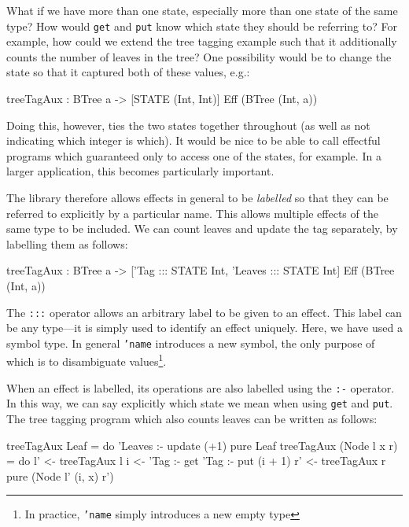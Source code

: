 What if we have more than one state, especially more than one state of the
same type? How would \texttt{get} and \texttt{put}
know which state they should be referring to? For example, how could we
extend the tree tagging example such that it additionally counts the number
of leaves in the tree?
%
One possibility would be to change the state so that it captured both of
these values, e.g.:

\begin{code}
treeTagAux : BTree a -> { [STATE (Int, Int)] } Eff (BTree (Int, a))
\end{code}

\noindent
Doing this, however, ties the two states together throughout (as well as
not indicating which integer is which). It would be nice to be able to
call effectful programs which guaranteed only to access one of the states,
for example. In a larger application, this becomes particularly important.

The \effects{} library therefore allows effects in general to be
\emph{labelled} so that they can be referred to explicitly by a particular
name. This allows multiple effects of the same type to be included. We can
count leaves and update the tag separately, by labelling them as follows:

\begin{code}
treeTagAux : BTree a -> { ['Tag ::: STATE Int,
                           'Leaves ::: STATE Int] } Eff (BTree (Int, a))
\end{code}

\noindent
The \texttt{:::} operator allows an arbitrary label to be given to an effect.
This label can be any type---it is simply used to identify an effect uniquely.
Here, we have used a symbol type. In general \texttt{'name} introduces a
new symbol, the only purpose of which is to disambiguate values\footnote{In
practice, \texttt{'name} simply introduces a new empty type}. 

When an effect is labelled, its operations are also labelled using the
\texttt{:-} operator. In this way, we can say explicitly which state we mean
when using \texttt{get} and \texttt{put}. The tree tagging program which also
counts leaves can be written as follows:

\begin{code}
treeTagAux Leaf = do 'Leaves :- update (+1)
                     pure Leaf
treeTagAux (Node l x r)
  = do l' <- treeTagAux l
       i <- 'Tag :- get
       'Tag :- put (i + 1)
       r' <- treeTagAux r
       pure (Node l' (i, x) r')
\end{code}

